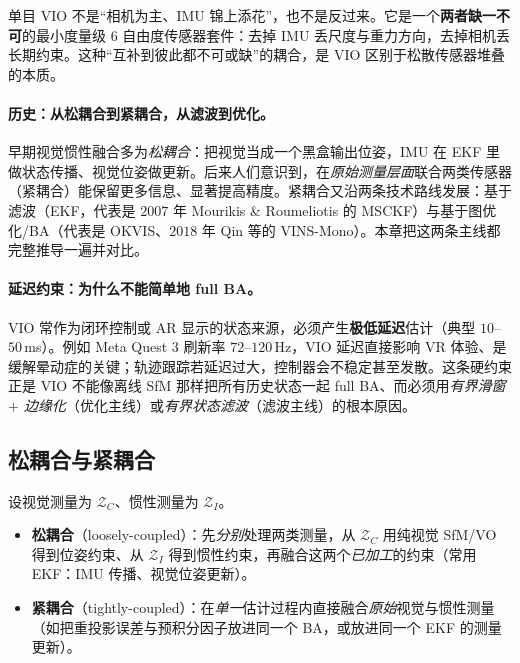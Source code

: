 \begin{insight}
单目 VIO 不是“相机为主、IMU 锦上添花”，也不是反过来。它是一个\textbf{两者缺一不可}的最小度量级 $6$ 自由度传感器套件：去掉 IMU 丢尺度与重力方向，去掉相机丢长期约束。这种“互补到彼此都不可或缺”的耦合，是 VIO 区别于松散传感器堆叠的本质。
\end{insight}

\paragraph{历史：从松耦合到紧耦合，从滤波到优化。}
早期视觉惯性融合多为\emph{松耦合}\cite{huang2019vins}：把视觉当成一个黑盒输出位姿，IMU 在 EKF 里做状态传播、视觉位姿做更新。后来人们意识到，在\emph{原始测量层面}联合两类传感器（紧耦合）能保留更多信息、显著提高精度。紧耦合又沿两条技术路线发展：基于滤波（EKF，代表是 $2007$ 年 Mourikis \& Roumeliotis 的 MSCKF\cite{mourikis2007msckf}）与基于图优化/BA（代表是 OKVIS、$2018$ 年 Qin 等的 VINS-Mono\cite{qin2018vins}）。本章把这两条主线都完整推导一遍并对比。

\paragraph{延迟约束：为什么不能简单地 full BA。}
VIO 常作为闭环控制或 AR 显示的状态来源，必须产生\textbf{极低延迟}估计（典型 $10$--$50\,$ms）\cite{carlone2026handbook}。例如 Meta Quest 3 刷新率 $72$--$120\,$Hz，VIO 延迟直接影响 VR 体验、是缓解晕动症的关键；轨迹跟踪若延迟过大，控制器会不稳定甚至发散。这条硬约束正是 VIO 不能像离线 SfM 那样把所有历史状态一起 full BA、而必须用\emph{有界滑窗 $+$ 边缘化}（优化主线）或\emph{有界状态滤波}（滤波主线）的根本原因。

\subsection{松耦合与紧耦合}
\label{sec:vio-coupling}

\begin{definition}[松耦合与紧耦合]\label{def:vio-coupling}
设视觉测量为 $\mathcal{Z}_C$、惯性测量为 $\mathcal{Z}_I$。
\begin{itemize}
  \item \textbf{松耦合}（loosely-coupled）：先\emph{分别}处理两类测量，从 $\mathcal{Z}_C$ 用纯视觉 SfM/VO 得到位姿约束、从 $\mathcal{Z}_I$ 得到惯性约束，再融合这两个\emph{已加工}的约束（常用 EKF：IMU 传播、视觉位姿更新）。
  \item \textbf{紧耦合}（tightly-coupled）：在\emph{单一}估计过程内直接融合\emph{原始}视觉与惯性测量（如把重投影误差与预积分因子放进同一个 BA，或放进同一个 EKF 的测量更新）。
\end{itemize}
\end{definition}

